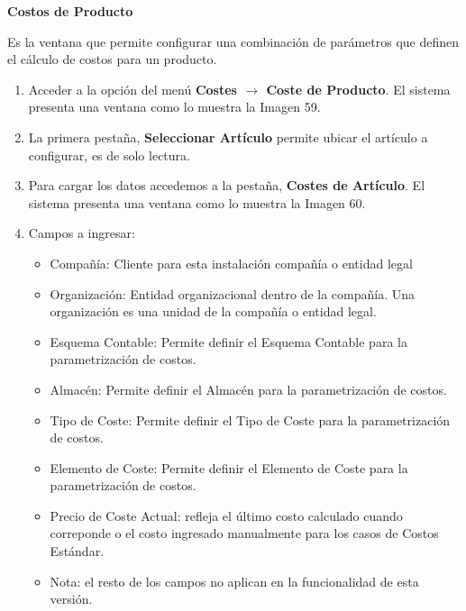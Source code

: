 \documentclass[letterpaper,10pt,spanish]{sphinxmanual}
\begin{document}
\textbf{Costos de Producto}

Es la ventana que permite configurar una combinación de parámetros que definen el cálculo de costos para un producto.
\begin{enumerate}
\item {} 
Acceder a la opción del menú \textbf{Costes \(\rightarrow\) Coste de Producto}. El sistema presenta una ventana como lo muestra la Imagen 59.

\item {} 
La primera pestaña, \textbf{Seleccionar Artículo} permite ubicar el artículo a configurar, es de solo lectura.

\item {} 
Para cargar los datos accedemos a la pestaña, \textbf{Costes de Artículo}. El sistema presenta una ventana como lo muestra la Imagen 60.

\item {} 
Campos a ingresar:
\begin{itemize}
\item {} 
Compañía: Cliente para esta instalación compañía o entidad legal

\item {} 
Organización: Entidad organizacional dentro de la compañía. Una organización es una unidad de la compañía o entidad legal.

\item {} 
Esquema Contable: Permite definir el Esquema Contable para la parametrización de costos.

\item {} 
Almacén: Permite definir el Almacén para la parametrización de costos.

\item {} 
Tipo de Coste: Permite definir el Tipo de Coste para la parametrización de costos.

\item {} 
Elemento de Coste: Permite definir el Elemento de Coste para la parametrización de costos.

\item {} 
Precio de Coste Actual: refleja el último costo calculado cuando correponde o el costo ingresado manualmente para los casos de Costos Estándar.

\item {} 
Nota: el resto de los campos no aplican en la funcionalidad de esta versión.

\end{itemize}

\end{enumerate}
\end{document}
